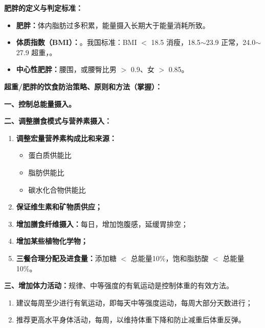 \begin{defbox}
\textbf{肥胖的定义与判定标准：}
\begin{itemize}[leftmargin=*]
    \item \textbf{肥胖：}体内脂肪过多积累，能量摄入长期大于能量消耗所致。
    \item \textbf{体质指数（BMI）：}。我国标准：BMI $<$ 18.5 消瘦，18.5$\sim$23.9 正常，24.0$\sim$27.9 超重，。
    \item \textbf{中心性肥胖：}腰围，或腰臀比男 $>$ 0.9、女 $>$ 0.85。
\end{itemize}
\end{defbox}

\begin{keybox}
\textbf{超重/肥胖的饮食防治策略、原则和方法（掌握）：}

\textbf{一、控制总能量摄入。}

\textbf{二、调整膳食模式与营养素摄入：}
\begin{enumerate}[leftmargin=*]
    \item \textbf{调整宏量营养素构成比和来源：}
    \begin{itemize}[leftmargin=*]
        \item 蛋白质供能比
        \item 脂肪供能比
        \item 碳水化合物供能比
    \end{itemize}
    \item \textbf{保证维生素和矿物质供应；}
    \item \textbf{增加膳食纤维摄入：}每日，增加饱腹感，延缓胃排空；
    \item \textbf{增加某些植物化学物；}
    \item \textbf{三餐合理分配及进食量：}添加糖 $<$ 总能量10\%，饱和脂肪酸 $<$ 总能量10\%。
\end{enumerate}

\textbf{三、增加体力活动：}规律、中等强度的有氧运动是控制体重的有效方法。
\begin{enumerate}[leftmargin=*]
    \item 建议每周至少进行有氧运动，即每天中等强度运动，每周大部分天数进行；
    \item 推荐更高水平身体活动，每周，以维持体重下降和防止减重后体重反弹。
\end{enumerate}


\end{keybox}
